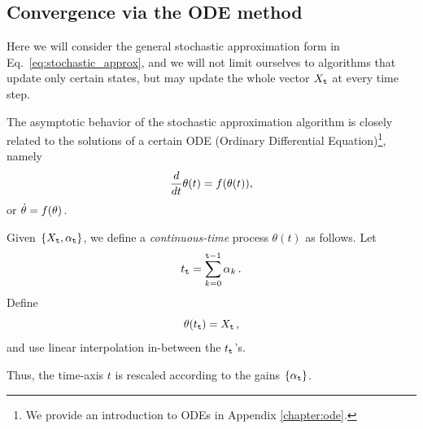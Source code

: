 \subsection{Convergence via the ODE method}
Here we will consider the general stochastic approximation form in Eq.~\ref{eq:stochastic_approx}, and we will not limit ourselves to algorithms that update only certain states, but may update the whole vector $X_{\tt t}$ at every time step. 

The asymptotic behavior of the stochastic approximation algorithm is closely related to the solutions
of a certain ODE (Ordinary Differential Equation)\footnote{We provide an introduction to ODEs in Appendix \ref{chapter:ode}.}, namely
$$
\frac{d}{dt}\theta(t)=f(\theta(t)),
$$
or $\dot{\theta}=f(\theta)$.

Given $\{X_{\tt t}, \alpha_{\tt t}\}$, we define a {\em continuous-time} process
$\theta(t)$ as follows.  Let
$$
t_{\tt t} = \sum_{k=0}^{{\tt t}-1} \alpha_k\,.
$$
Define
$$
\theta(t_{\tt t}) = X_{\tt t}\,,
$$
and use linear interpolation in-between the $t_{\tt t}$'s.

Thus, the time-axis $t$ is rescaled according to the gains $\{\alpha_{\tt t}\}$.

\begin{center}
\end{center}


